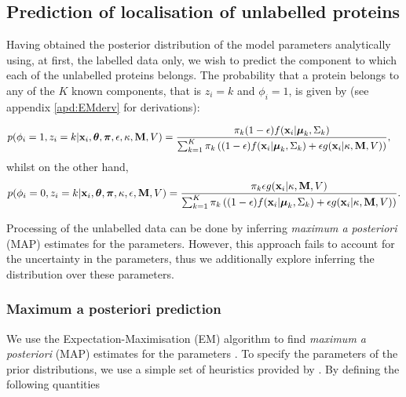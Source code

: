 \documentclass[12pt,english]{article}\usepackage[]{graphicx}\usepackage[]{color}
\begin{document}
\subsection{Prediction of localisation of unlabelled proteins}

Having obtained the posterior distribution of the model parameters
analytically using, at first, the labelled data only, we wish to
predict the component to which each of the unlabelled proteins
belongs. The probability that a protein belongs to any of the $K$
known components, that is $z_i = k$ and $\phi_i = 1$, is given by (see
appendix \ref{apd:EMderv} for derivations):

\begin{equation}\label{equation::estep1}
\begin{split}
p(\phi_i = 1, z_i = k|{\bf x}_i, \boldsymbol{\theta}, \boldsymbol{\pi} , \epsilon,\kappa, {\bf M}, V)  & = \frac{\pi_k(1-\epsilon)f({\bf x}_i|\boldsymbol{\mu}_k, \Sigma_{k})}{\sum_{k=1}^{K}\pi_k\left((1-\epsilon) f({\bf x}_i|\boldsymbol{\mu}_k, \Sigma_k) + \epsilon g({\bf x}_i|\kappa, {\bf M}, V)\right)},
\end{split}
\end{equation}
whilst on the other hand,
\begin{equation}\label{equation::estep2}
\begin{split}
p(\phi_i = 0, z_i = k|{\bf x}_i, \boldsymbol{\theta}, \boldsymbol{\pi},\kappa, \epsilon, {\bf M}, V)  = \frac{\pi_k \epsilon g({\bf x}_i|\kappa, {\bf M}, V)}{\sum_{k=1}^{K}\pi_k\left((1-\epsilon) f({\bf x}_i|\boldsymbol{\mu}_k, \Sigma_k) + \epsilon g({\bf x}_i|\kappa, {\bf M}, V)\right)}.
\end{split}
\end{equation}

Processing of the unlabelled data can be done by inferring {\em maximum
  a posteriori} (MAP) estimates for the parameters. However, this
approach fails to account for the uncertainty in the parameters, thus
we additionally explore inferring the distribution over these
parameters.

\subsubsection{Maximum a posteriori prediction}

We use the Expectation-Maximisation (EM) algorithm \citep{EM:1977} to
find {\em maximum a posteriori} (MAP) estimates for the parameters
\cite[see, for example,][]{Murphy:2012}. To specify the parameters of
the prior distributions, we use a simple set of heuristics provided by
\cite{Fraley:2007}. By defining the following quantities
\end{document}
